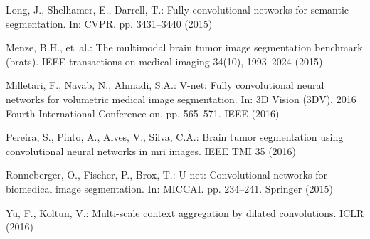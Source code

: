 \documentclass{llncs}
\begin{document}
\begin{thebibliography}{10}
Long, J., Shelhamer, E., Darrell, T.: Fully convolutional networks for semantic
  segmentation. In: CVPR. pp. 3431--3440 (2015)

Menze, B.H., et~al.: The multimodal brain tumor image segmentation benchmark
  (brats). IEEE transactions on medical imaging  34(10),  1993--2024 (2015)

Milletari, F., Navab, N., Ahmadi, S.A.: V-net: Fully convolutional neural
  networks for volumetric medical image segmentation. In: 3D Vision (3DV), 2016
  Fourth International Conference on. pp. 565--571. IEEE (2016)

Pereira, S., Pinto, A., Alves, V., Silva, C.A.: Brain tumor segmentation using
  convolutional neural networks in mri images. IEEE TMI  35 (2016)

Ronneberger, O., Fischer, P., Brox, T.: U-net: Convolutional networks for
  biomedical image segmentation. In: MICCAI. pp. 234--241. Springer (2015)

Yu, F., Koltun, V.: Multi-scale context aggregation by dilated convolutions.
  ICLR  (2016)

\end{thebibliography}
\end{document}
